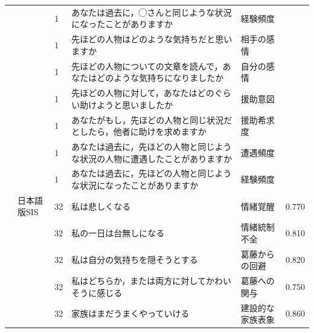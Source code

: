 \begin{landscape}
\begin{longtable}{p{2cm}p{2cm}p{2cm}p{6cm}p{2cm}p{2cm}}
		                         &                                  & 1   & あなたは過去に，◯さんと同じような状況になったことがありますか                     & 経験頻度                 &            \\
		                         &                                  & 1   & 先ほどの人物はどのような気持ちだと思いますか                              & 相手の感情                &            \\
		                         &                                  & 1   & 先ほどの人物についての文章を読んで，あなたはどのような気持ちになりましたか               & 自分の感情                &            \\
		                         &                                  & 1   & 先ほどの人物に対して，あなたはどのぐらい助けようと思いましたか                     & 援助意図                 &            \\
		                         &                                  & 1   & あなたがもし，先ほどの人物と同じ状況だとしたら，他者に助けを求めますか                 & 援助希求度                &            \\
		                         &                                  & 1   & あなたは過去に，先ほどの人物と同じような状況の人物に遭遇したことがありますか              & 遭遇頻度                 &            \\
		                         &                                  & 1   & あなたは過去に，先ほどの人物と同じような状況になったことがありますか                  & 経験頻度                 &            \\
		\textcite{Hirose202192}     & 日本語版SIS                          & 32  & 私は悲しくなる                                             & 情緒覚醒                 & 0.770      \\
		                         &                                  & 32  & 私の一日は台無しになる                                         & 情緒統制不全               & 0.810      \\
		                         &                                  & 32  & 私は自分の気持ちを隠そうとする                                     & 葛藤からの回避              & 0.820      \\
		                         &                                  & 32  & 私はどちらか，または両方に対してかわいそうに感じる                           & 葛藤への関与               & 0.750      \\
		                         &                                  & 32  & 家族はまだうまくやっていける                                      & 建設的な家族表象             & 0.860      \\

\end{longtable}
\end{landscape}
